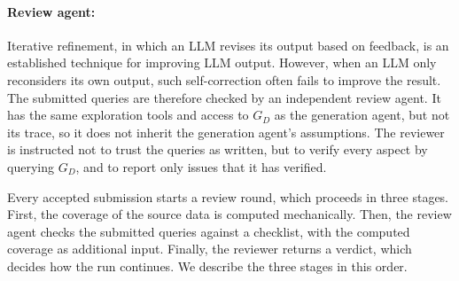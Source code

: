 \paragraph{Review agent:}
Iterative refinement, in which an LLM revises its output based on feedback, is an established technique for improving LLM output. However, when an LLM only reconsiders its own output, such self-correction often fails to improve the result. The submitted queries are therefore checked by an independent review agent. It has the same exploration tools and access to \(G_D\) as the generation agent, but not its trace, so it does not inherit the generation agent's assumptions. The reviewer is instructed not to trust the queries as written, but to verify every aspect by querying \(G_D\), and to report only issues that it has verified.

Every accepted submission starts a review round, which proceeds in three stages. First, the coverage of the source data is computed mechanically. Then, the review agent checks the submitted queries against a checklist, with the computed coverage as additional input. Finally, the reviewer returns a verdict, which decides how the run continues. We describe the three stages in this order.

